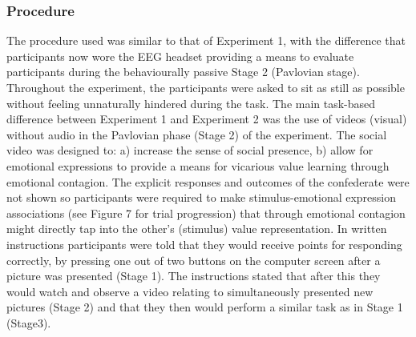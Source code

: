 \documentclass[]{elsarticle} %
\begin{document}
\hypertarget{procedure-1}{%
\subsubsection{Procedure}\label{procedure-1}}

The procedure used was similar to that of Experiment 1, with the
difference that participants now wore the EEG headset providing a means
to evaluate participants during the behaviourally passive Stage 2
(Pavlovian stage). Throughout the experiment, the participants were
asked to sit as still as possible without feeling unnaturally hindered
during the task. The main task-based difference between Experiment 1 and
Experiment 2 was the use of videos (visual) without audio in the
Pavlovian phase (Stage 2) of the experiment. The social video was
designed to: a) increase the sense of social presence, b) allow for
emotional expressions to provide a means for vicarious value learning
through emotional contagion. The explicit responses and outcomes of the
confederate were not shown so participants were required to make
stimulus-emotional expression associations (see Figure 7 for trial
progression) that through emotional contagion might directly tap into
the other's (stimulus) value representation. In written instructions
participants were told that they would receive points for responding
correctly, by pressing one out of two buttons on the computer screen
after a picture was presented (Stage 1). The instructions stated that
after this they would watch and observe a video relating to
simultaneously presented new pictures (Stage 2) and that they then would
perform a similar task as in Stage 1 (Stage3).
\end{document}
